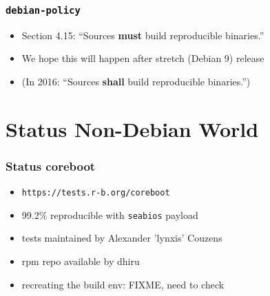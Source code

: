 \documentclass[14pt]{beamer}
\newif\ifplacelogo
\begin{document}
\begin{frame}
 \frametitle{\texttt{debian-policy}}

 \begin{itemize}
  \item Section 4.15: “Sources \textbf{must} build reproducible binaries.”
  \item<2-3> We hope this will happen after stretch (Debian 9) release
  \item<3> (In 2016: “Sources \textbf{shall} build reproducible binaries.”)
 \end{itemize}
\end{frame}


\section{Status Non-Debian World}

\placelogofalse

\begin{frame}
 \frametitle{Status coreboot}
 \begin{itemize}
  \item \texttt{https://tests.r-b.org/coreboot}
  \item 99.2\% reproducible with \texttt{seabios} payload
  \item tests maintained by Alexander 'lynxis' Couzens
  \item rpm repo available by dhiru
  \item recreating the build env: FIXME, need to check
 \end{itemize}
\end{frame}
\end{document}

